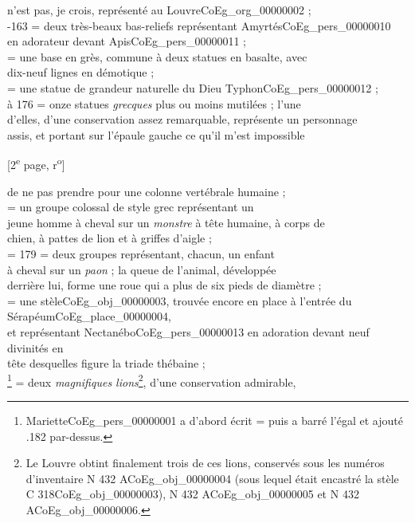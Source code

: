 \documentclass{book}
\begin{document}
n’est pas, je crois, représenté au Louvre\gls{CoEg_org_00000002} ;\\
-163 = deux très-beaux bas-reliefs représentant Amyrtés\gls{CoEg_pers_00000010}\\
en adorateur devant Apis\gls{CoEg_pers_00000011} ;\\
 = une base en grès, commune à deux statues en basalte, avec\\
dix-neuf lignes en démotique ;\\
 = une statue de grandeur naturelle du Dieu Typhon\gls{CoEg_pers_00000012} ;\\
 à 176 = onze statues \textit{grecques} plus ou moins mutilées ; l’une\\
d’elles, d’une conservation assez remarquable, représente un personnage\\
assis, et portant sur l’épaule gauche ce qu’il m’est impossible
{\footnotesize \begin{center} {[2\textsuperscript{e} page, r\textsuperscript{o}]}\end{center}}
\noindent de ne pas prendre pour une colonne vertébrale humaine ;\\
 = un groupe colossal de style grec représentant un\\
jeune homme à cheval sur un \textit{monstre} à tête humaine, à corps de\\
chien, à pattes de lion et à griffes d’aigle ;\\
 = 179 = deux groupes représentant, chacun, un enfant\\
à cheval sur un \textit{paon} ; la queue de l’animal, développée\\
derrière lui, forme une roue qui a plus de six pieds de diamètre ;\\
 = une stèle\gls{CoEg_obj_00000003}, trouvée encore en place à l’entrée du Sérapéum\gls{CoEg_place_00000004},\\
et représentant Nectanébo\gls{CoEg_pers_00000013} en adoration devant neuf divinités en\\
tête desquelles figure la triade thébaine ;\\
 \footnote{Mariette\gls{CoEg_pers_00000001} a d’abord écrit  = \fg puis a barré l’égal et ajouté \og .182 \fg par-dessus.} = deux \textit{magnifiques lions}\footnote{Le Louvre obtint finalement trois de ces lions, conservés sous les numéros d'inventaire N 432 A\gls{CoEg_obj_00000004} (sous lequel était encastré la stèle C 318\gls{CoEg_obj_00000003}), N 432 A\gls{CoEg_obj_00000005} et N 432 A\gls{CoEg_obj_00000006}.}, d’une conservation admirable,\\
\end{document}
